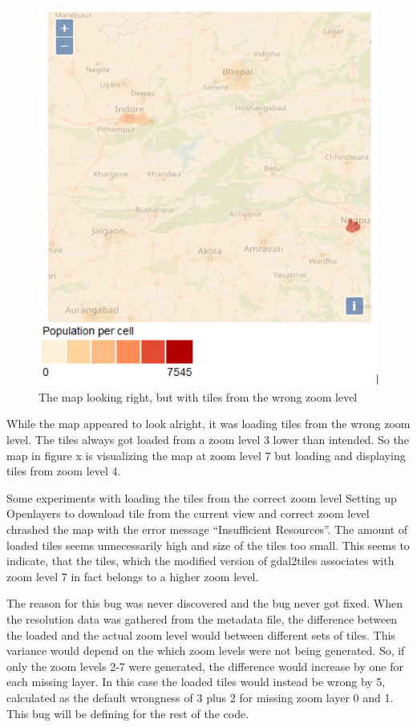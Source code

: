  
 \begin{figure} [H]
 	\centering
 	\includegraphics[width=.8\textwidth]{Pictures/MapWithWrongResolution}
 	\caption{The map looking right, but with tiles from the wrong zoom level}
 	\label{MapWithWrongResolution}
 \end{figure}


While the map appeared to look alright, it was loading tiles from the wrong zoom level. The tiles always got loaded from a zoom level 3 lower than intended. So the map in figure x is visualizing the map at zoom level 7 but loading and displaying tiles from zoom level 4.

Some experiments with loading the tiles from the correct zoom level 
Setting up Openlayers to download tile from the current view and correct zoom level chrashed the map with the error message “Insufficient Resources”. The amount of loaded tiles seems unnecessarily high and size of the tiles too small. This seems to indicate, that the tiles, which the modified version of gdal2tiles associates with zoom level 7 in fact belongs to a higher zoom level.

The reason for this bug was never discovered and the bug never got fixed. When the resolution data was gathered from the metadata file, the difference between the loaded and the actual zoom level would between different sets of tiles. This variance would depend on the which zoom levels were not being generated. So, if only the zoom levels 2-7 were generated, the difference would increase by one for each missing layer. In this case the loaded tiles would instead be wrong by 5, calculated as the default wrongness of 3 plus 2 for missing zoom layer 0 and 1. 
This bug will be defining for the rest of the code.



